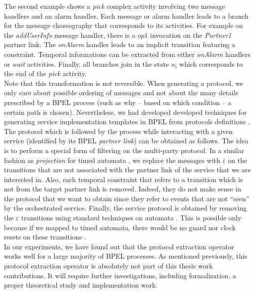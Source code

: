 The second example shows a \emph{pick} complex activity involving two message handlers and an alarm handler. Each message or alarm handler leads to a branch for the message choreography that corresponds to its activities. For example on the \emph{addUserInfo} message handler, there is a $op1$ invocation on the \emph{Partner1} partner link. The \emph{onAlarm} handler leads to an implicit transition featuring a \MInvoke constraint. Temporal informations can be extracted from either \emph{onAlarm} handlers or \emph{wait} activities. Finally, all branches join in the state $s_5$ which corresponds to the end of the \emph{pick} activity.\\

Note that this transformation is not reversible. When generating a protocol, we only care about possible ordering of messages and not about the many details prescribed by a BPEL process (such as why -- based on which condition -- a certain path is chosen). Nevertheless, we had developed developed techniques for generating service implementation templates in BPEL from protocols definitions \cite{KBBB+04}.\\

The protocol which is followed by the process while interacting with a given service (identified by its BPEL \emph{partner link}) can be obtained as follows. The idea is to perform a special form of filtering on the multi-party protocol. In a similar fashion as \emph{projection} for timed automata \cite{RAPM04}, we replace the messages with $\varepsilon$ on the transitions that are not associated with the partner link of the service that we are interested in. Also, each temporal constraint that refers to a transition which is not from the target partner link is removed. Indeed, they do not make sense in the protocol that we want to obtain since they refer to events that are not ``seen'' by the orchestrated service. Finally, the service protocol is obtained by removing the $\varepsilon$ transitions using standard techniques on automata \cite{Hopcroft79}. This is possible only because if we mapped to timed automata, there would be no guard nor clock resets on these transitions \cite{VDPG97}.\\

In our experiments, we have found out that the protocol extraction operator works well for a large majority of BPEL processes. As mentioned previously, this protocol extraction operator is absolutely not part of this thesis work contributions. It will require further investigations, including formalization, a proper theoretical study and implementation work.

